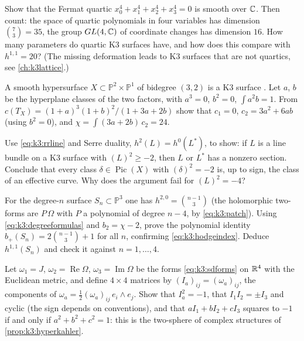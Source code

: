 \begin{exercise}[$\star$]
Show that the Fermat quartic $x_0^4+x_1^4+x_2^4+x_3^4=0$ is smooth over $\mathbb{C}$. Then count: the
space of quartic polynomials in four variables has dimension $\binom73=35$, the group
$GL(4,\mathbb{C})$ of coordinate changes has dimension $16$. How many parameters do quartic K3 surfaces
have, and how does this compare with $h^{1,1}=20$? (The missing deformation leads to K3
surfaces that are not quartics, see \cref{ch:k3lattice}.)
\end{exercise}

\begin{exercise}[$\star\star$]
A smooth hypersurface $X\subset\mathbb{P}^2\times\mathbb{P}^1$ of bidegree $(3,2)$ is a K3
surface . Let $a$, $b$ be the hyperplane classes of the two
factors, with $a^3=0$, $b^2=0$, $\int a^2b=1$. From $c(T_X)=(1+a)^3(1+b)^2/(1+3a+2b)$ show that
$c_1=0$, $c_2=3a^2+6ab$ (using $b^2=0$), and $\chi=\int(3a+2b)\,c_2=24$.
\end{exercise}

\begin{exercise}[$\star\star$]
Use \eqref{eq:k3:rrline} and Serre duality, $h^2(L)=h^0(L^*)$, to show: if $L$ is a line bundle
on a K3 surface with $(L)^2\ge-2$, then $L$ or $L^*$ has a nonzero section. Conclude that every
class $\delta\in\operatorname{Pic}(X)$ with $(\delta)^2=-2$ is, up to sign, the class of an
effective curve. Why does the argument fail for $(L)^2=-4$?
\end{exercise}

\begin{exercise}[$\star\star$]
For the degree-$n$ surface $S_n\subset\mathbb{P}^3$ one has $h^{2,0}=\binom{n-1}{3}$ (the
holomorphic two-forms are $P\,\Omega$ with $P$ a polynomial of degree $n-4$, by
\eqref{eq:k3:patch}). Using \eqref{eq:k3:degreeformulas} and $b_2=\chi-2$, prove the polynomial
identity $b_+(S_n)=2\binom{n-1}{3}+1$ for all $n$, confirming \eqref{eq:k3:hodgeindex}. Deduce
$h^{1,1}(S_n)$ and check it against $n=1,\dots,4$.
\end{exercise}

\begin{exercise}[$\star\star$]
Let $\omega_1=J$, $\omega_2=\operatorname{Re}\Omega$, $\omega_3=\operatorname{Im}\Omega$ be
the forms \eqref{eq:k3:sdforms} on $\mathbb{R}^4$ with the Euclidean metric, and define $4\times4$
matrices by $(I_a)_{ij}=(\omega_a)_{ij}$, the components of $\omega_a=\frac12(\omega_a)_{ij}\,
e_i\wedge e_j$. Show that $I_a^2=-1$, that $I_1I_2=\pm I_3$ and cyclic (the sign depends on conventions), and
that $aI_1+bI_2+cI_3$ squares to $-1$ if and only if $a^2+b^2+c^2=1$: this is the two-sphere of
complex structures of \cref{prop:k3:hyperkahler}.
\end{exercise}

